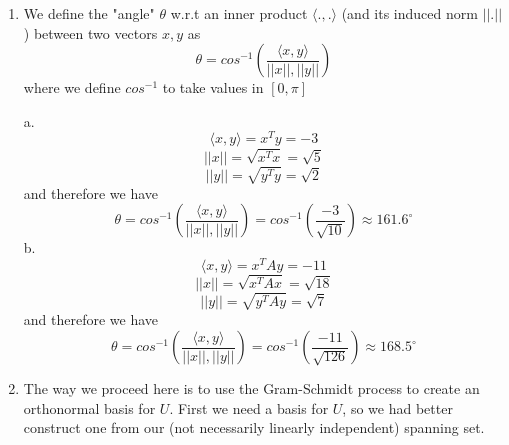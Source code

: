 \documentclass{article}
\newcommand{\chapternumber}{3}
\newenvironment{QandA}{\begin{enumerate}[label=\chapternumber.\arabic*]\bfseries\boldmath}
	{\end{enumerate}}
\newenvironment{answered}{\par\bigskip\normalfont\unboldmath}{}
\begin{document}
\begin{QandA}
		\item
		\begin{answered}
			We define the "angle" $\theta$ w.r.t an inner product $\langle .,. \rangle$ (and its induced norm $||.||$) between two vectors $x,y$ as
			\[\theta = cos^{-1}\left(\frac{\langle x,y \rangle}{||x||,||y||}\right)\]
			where we define $cos^{-1}$ to take values in $[0,\pi]$
			
			a. 
			\[\langle x,y \rangle = x^Ty = -3\]
			\[||x|| = \sqrt{x^Tx} = \sqrt{5}\]
			\[||y|| = \sqrt{y^Ty} = \sqrt{2}\]
			and therefore we have
			\[\theta = cos^{-1}\left(\frac{\langle x,y \rangle}{||x||,||y||}\right) = cos^{-1}\left(\frac{-3}{\sqrt{10}}\right)\approx 161.6^\circ\]
			b.
			\[\langle x,y \rangle = x^TAy = -11\]
			\[||x|| = \sqrt{x^TAx} = \sqrt{18}\]
			\[||y|| = \sqrt{y^TAy} = \sqrt{7}\]
			and therefore we have
			\[\theta = cos^{-1}\left(\frac{\langle x,y \rangle}{||x||,||y||}\right) = cos^{-1}\left(\frac{-11}{\sqrt{126}}\right)\approx 168.5^\circ\]
		\end{answered}
		
		\item
		\begin{answered}
			The way we proceed here is to use the Gram-Schmidt process to create an orthonormal basis for $U$. First we need a basis for $U$, so we had better construct one from our (not necessarily linearly independent) spanning set.
			

\end{answered}
\end{QandA}
\end{document}
